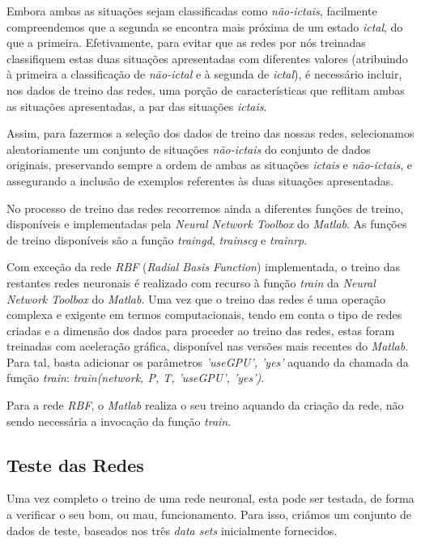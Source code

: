 \documentclass{article}
\begin{document}
Embora ambas as situações sejam classificadas como \emph{não-ictais}, facilmente compreendemos que a segunda se encontra mais próxima de um estado \emph{ictal}, do que a primeira. Efetivamente, para evitar que as redes por nós treinadas classifiquem estas duas situações apresentadas com diferentes valores (atribuindo à primeira a classificação de \emph{não-ictal} e à segunda de \emph{ictal}), é necessário incluir, nos dados de treino das redes, uma porção de características que reflitam ambas as situações apresentadas, a par das situações \emph{ictais}.

Assim, para fazermos a seleção dos dados de treino das nossas redes, selecionamos aleatoriamente um conjunto de situações \emph{não-ictais} do conjunto de dados originais, preservando sempre a ordem de ambas as situações \emph{ictais} e \emph{não-ictais}, e assegurando a inclusão de exemplos referentes às duas situações apresentadas.

No processo de treino das redes recorremos ainda a diferentes funções de treino, disponíveis e implementadas pela \emph{Neural Network Toolbox} do \emph{Matlab}. As funções de treino disponíveis são a função \emph{traingd}, \emph{trainscg} e \emph{trainrp}.

Com exceção da rede \emph{RBF} (\emph{Radial Basis Function}) implementada, o treino das restantes redes neuronais é realizado com recurso à função \emph{train} da \emph{Neural Network Toolbox} do \emph{Matlab}. Uma vez que o treino das redes é uma operação complexa e exigente em termos computacionais, tendo em conta o tipo de redes criadas e a dimensão dos dados para proceder ao treino das redes, estas foram treinadas com aceleração gráfica, disponível nas versões mais recentes do \emph{Matlab}. Para tal, basta adicionar os parâmetros \emph{'useGPU', 'yes'} aquando da chamada da função \emph{train}: \emph{train(network, P, T, 'useGPU', 'yes')}.

Para a rede \emph{RBF}, o \emph{Matlab} realiza o seu treino aquando da criação da rede, não sendo necessária a invocação da função \emph{train}.

\subsection{Teste das Redes}

Uma vez completo o treino de uma rede neuronal, esta pode ser testada, de forma a verificar o seu bom, ou mau, funcionamento. Para isso, criámos um conjunto de dados de teste, baseados nos três \emph{data sets} inicialmente fornecidos.
\end{document}
